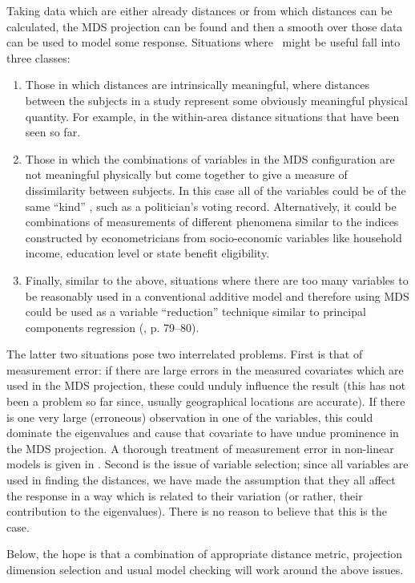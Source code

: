 Taking data which are\label{cor-r1-3} either already distances or from which distances can be calculated, the MDS projection can be found and then a smooth over those data can be used to model some response. Situations where \mdsds\ might be useful fall into three classes: 
\begin{enumerate}
\item Those in which distances are intrinsically meaningful, where distances between the subjects in a study represent some obviously meaningful physical quantity. For example, in the within-area distance situations that have been seen so far.
\item Those in which the combinations of variables in the MDS configuration are not meaningful physically but come together to give a measure of dissimilarity between subjects. In this case all of the variables could be of the same ``kind'' , such as a politician's voting record. Alternatively, it could be combinations of measurements of different phenomena similar to the indices constructed by econometricians from socio-economic variables like household income, education level or state benefit eligibility.
\item Finally, similar to the above, situations where there are too many variables to be reasonably used in a conventional additive model and therefore using MDS could be used as a variable ``reduction'' technique similar to principal\label{cor-r30-1} components regression (\cite{elements}, p. 79--80).
\end{enumerate}
The latter two situations pose two interrelated problems. First is that of measurement error: if there are large errors in the measured covariates which are used in the MDS projection, these could unduly influence the result (this has not been a problem so far since, usually geographical locations are accurate). If there is one very large (erroneous) observation in one of the variables, this could dominate the eigenvalues and cause that covariate to have undue prominence in the MDS projection. A thorough treatment of measurement error in non-linear models is given in . Second is the issue of variable selection; since all variables are used in finding the distances, we have made the assumption that they all affect the response in a way which is related to their\label{cor-5s9} variation (or rather, their contribution to the eigenvalues). There is no reason to believe that this is the case.

Below, the hope is that a combination of appropriate distance metric, projection dimension selection and usual model checking will work around the above issues.

